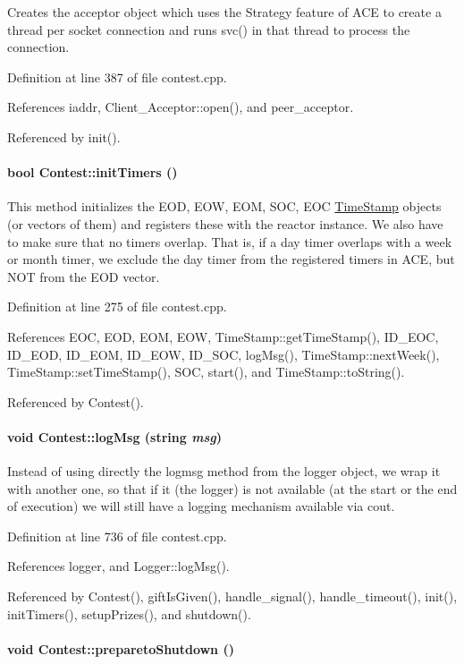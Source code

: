 Creates the acceptor object which uses the Strategy feature of ACE to create a thread per socket connection and runs svc() in that thread to process the connection. 

Definition at line 387 of file contest.cpp.

References iaddr, Client\_\-Acceptor::open(), and peer\_\-acceptor.

Referenced by init().\hypertarget{classContest_Contesta7}{
\paragraph[initTimers]{\setlength{\rightskip}{0pt plus 5cm}bool Contest::init\-Timers ()}\hfill}
\label{classContest_Contesta7}


This method initializes the EOD, EOW, EOM, SOC, EOC \hyperlink{classTimeStamp}{Time\-Stamp} objects (or vectors of them) and registers these with the reactor instance. We also have to make sure that no timers overlap. That is, if a day timer overlaps with a week or month timer, we exclude the day timer from the registered timers in ACE, but NOT from the EOD vector. 

Definition at line 275 of file contest.cpp.

References EOC, EOD, EOM, EOW, Time\-Stamp::get\-Time\-Stamp(), ID\_\-EOC, ID\_\-EOD, ID\_\-EOM, ID\_\-EOW, ID\_\-SOC, log\-Msg(), Time\-Stamp::next\-Week(), Time\-Stamp::set\-Time\-Stamp(), SOC, start(), and Time\-Stamp::to\-String().

Referenced by Contest().\hypertarget{classContest_Contesta19}{
\paragraph[logMsg]{\setlength{\rightskip}{0pt plus 5cm}void Contest::log\-Msg (string {\em msg})}\hfill}
\label{classContest_Contesta19}


Instead of using directly the logmsg method from the logger object, we wrap it with another one, so that if it (the logger) is not available (at the start or the end of execution) we will still have a logging mechanism available via cout. 

Definition at line 736 of file contest.cpp.

References logger, and Logger::log\-Msg().

Referenced by Contest(), gift\-Is\-Given(), handle\_\-signal(), handle\_\-timeout(), init(), init\-Timers(), setup\-Prizes(), and shutdown().\hypertarget{classContest_Contesta4}{
\paragraph[preparetoShutdown]{\setlength{\rightskip}{0pt plus 5cm}void Contest::prepareto\-Shutdown ()}\hfill}
\label{classContest_Contesta4}


